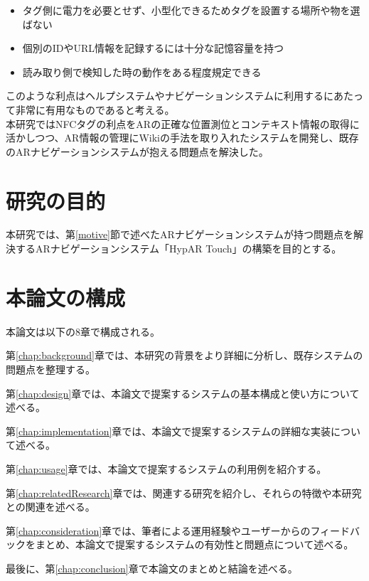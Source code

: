 \begin{itemize}
  \item タグ側に電力を必要とせず、小型化できるためタグを設置する場所や物を選ばない
  \item 個別のIDやURL情報を記録するには十分な記憶容量を持つ
  \item 読み取り側で検知した時の動作をある程度規定できる
\end{itemize}

このような利点はヘルプシステムやナビゲーションシステムに利用するにあたって非常に有用なものであると考える。
\\
本研究ではNFCタグの利点をARの正確な位置測位とコンテキスト情報の取得に活かしつつ、AR情報の管理にWikiの手法を取り入れたシステムを開発し、既存のARナビゲーションシステムが抱える問題点を解決した。

\section{研究の目的}
本研究では、第\ref{motive}節で述べたARナビゲーションシステムが持つ問題点を解決するARナビゲーションシステム「HypAR Touch」の構築を目的とする。


\section{本論文の構成}

本論文は以下の8章で構成される。

第\ref{chap:background}章では、本研究の背景をより詳細に分析し、既存システムの問題点を整理する。

第\ref{chap:design}章では、本論文で提案するシステムの基本構成と使い方について述べる。

第\ref{chap:implementation}章では、本論文で提案するシステムの詳細な実装について述べる。

第\ref{chap:usage}章では、本論文で提案するシステムの利用例を紹介する。

第\ref{chap:relatedResearch}章では、関連する研究を紹介し、それらの特徴や本研究との関連を述べる。

第\ref{chap:consideration}章では、筆者による運用経験やユーザーからのフィードバックをまとめ、本論文で提案するシステムの有効性と問題点について述べる。

最後に、第\ref{chap:conclusion}章で本論文のまとめと結論を述べる。